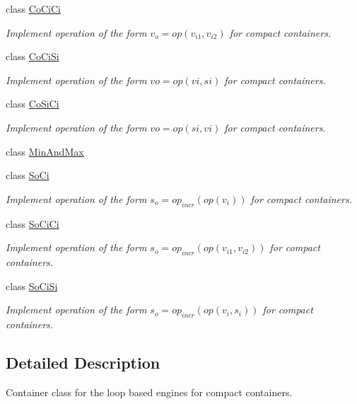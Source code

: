 \begin{DoxyCompactItemize}
class \hyperlink{classvct_dynamic_compact_loop_engines_1_1_co_ci_ci}{Co\+Ci\+Ci}
\begin{DoxyCompactList}\small\item\em Implement operation of the form $v_o = op(v_{i1}, v_{i2})$ for compact containers. \end{DoxyCompactList}\item 
class \hyperlink{classvct_dynamic_compact_loop_engines_1_1_co_ci_si}{Co\+Ci\+Si}
\begin{DoxyCompactList}\small\item\em Implement operation of the form $vo = op(vi, si)$ for compact containers. \end{DoxyCompactList}\item 
class \hyperlink{classvct_dynamic_compact_loop_engines_1_1_co_si_ci}{Co\+Si\+Ci}
\begin{DoxyCompactList}\small\item\em Implement operation of the form $vo = op(si, vi)$ for compact containers. \end{DoxyCompactList}\item 
class \hyperlink{classvct_dynamic_compact_loop_engines_1_1_min_and_max}{Min\+And\+Max}
\item 
class \hyperlink{classvct_dynamic_compact_loop_engines_1_1_so_ci}{So\+Ci}
\begin{DoxyCompactList}\small\item\em Implement operation of the form $s_o = op_{incr}(op(v_i))$ for compact containers. \end{DoxyCompactList}\item 
class \hyperlink{classvct_dynamic_compact_loop_engines_1_1_so_ci_ci}{So\+Ci\+Ci}
\begin{DoxyCompactList}\small\item\em Implement operation of the form $s_o = op_{incr}(op(v_{i1}, v_{i2}))$ for compact containers. \end{DoxyCompactList}\item 
class \hyperlink{classvct_dynamic_compact_loop_engines_1_1_so_ci_si}{So\+Ci\+Si}
\begin{DoxyCompactList}\small\item\em Implement operation of the form $s_o = op_{incr}(op(v_i, s_i))$ for compact containers. \end{DoxyCompactList}\end{DoxyCompactItemize}


\subsection{Detailed Description}
Container class for the loop based engines for compact containers. 

